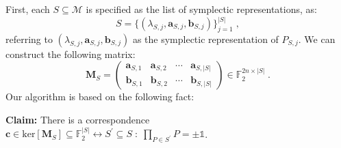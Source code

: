 \documentclass[10pt,aps,pra,twocolumn,floatfix,nofootinbib,superscriptaddress,longbibliography]{revtex4-2}
\newcommand{\1}{\mathbbm{1}}
\begin{document}
First, each $S\subseteq \mathcal M$ is specified as the list of symplectic representations, as:
    \begin{equation}
        S =\{(\lambda_{S,j}, \mathbf a_{S,j}, \mathbf b_{S,j})\}_{j =1}^{|S|}\;,
    \end{equation}
    referring to $(\lambda_{S,j}, \mathbf a_{S,j}, \mathbf b_{S,j})$ as the symplectic representation of $P_{S,j}$. We can construct the following matrix:
    \begin{equation}
        \mathbf M_S =
        \begin{pmatrix}
            \mathbf a_{S,1} & \mathbf a_{S,2} & \cdots & \mathbf a_{S, |S|}\\
            \mathbf b_{S,1} & \mathbf b_{S,2} & \cdots & \mathbf b_{S, |S|}
        \end{pmatrix} \in \mathbb F_2^{2n\times|S|}\;.
    \end{equation}
    Our algorithm is based on the following fact:
    
    \textbf{Claim: } There is a correspondence $\mathbf c \in \mathrm{ker}[\mathbf M_S] \subseteq \mathbb F_2^{|S|} \longleftrightarrow S^\prime \subseteq S\;:\;\prod_{P \in S^\prime }P=\pm\mathds{1}$.
\end{document}
